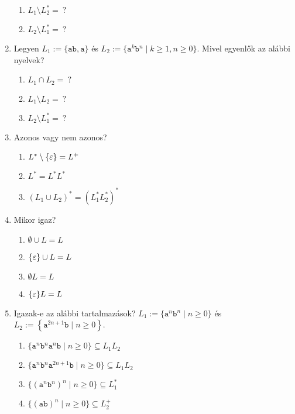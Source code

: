\begin{enumerate}
\begin{enumerate}
		\item $L_1 \setminus L_2^* = ~?$
		\item $L_2 \setminus L_1^* = ~?$
	\end{enumerate}
	\item Legyen $L_1 := \{ \texttt{ab}, \texttt{a} \}$ és $L_2 := \{ \texttt{a}^k\texttt{b}^n \mid k \geq 1, n \geq 0 \}$. Mivel egyenlők az alábbi nyelvek?
	\begin{enumerate}
		\item $L_1 \cap L_2 = ~?$
		\item $L_1 \setminus L_2 = ~?$
		\item $L_2 \setminus L_1^* = ~?$
	\end{enumerate}
	\item Azonos vagy nem azonos?
	\begin{enumerate}
		\item $L^* \setminus \{\varepsilon\} = L^+$
		\item $L^* = L^* L^*$
		\item $(L_1 \cup L_2)^* = (L_1^* L_2^* )^*$
	\end{enumerate}
	\item Mikor igaz?
	\begin{enumerate}
		\item $\emptyset \cup L = L$
		\item $\{\varepsilon\} \cup L = L$
		\item $\emptyset L = L$
		\item $\{ \varepsilon \}L = L$
	\end{enumerate}
	\item Igazak-e az alábbi tartalmazások? $L_1 := \{ \texttt{a}^n\texttt{b}^n \mid n \geq 0 \}$ és $L_2 := \left\{ \texttt{a}^{2n+1}\texttt{b} \mid n \geq 0 \right\}$.
	\begin{enumerate}
		\item $\{ \texttt{a}^n\texttt{b}^n\texttt{a}^n\texttt{b} \mid n \geq 0 \} \subseteq L_1L_2$
		\item $\{ \texttt{a}^n\texttt{b}^n\texttt{a}^{2n+1}\texttt{b} \mid n \geq 0 \} \subseteq L_1L_2$
		\item $\{ (\texttt{a}^n\texttt{b}^n)^n \mid n \geq 0 \} \subseteq L_1^*$
		\item $\{ (\texttt{ab})^n \mid n \geq 0 \} \subseteq L_2^+$
	\end{enumerate}
\end{enumerate}

\fi
